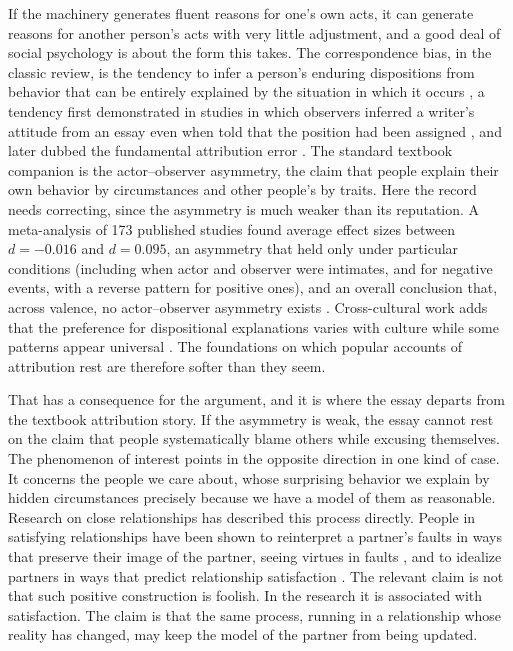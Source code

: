 \documentclass[11pt]{article}
\theoremstyle{definition}
\theoremstyle{remark}
\begin{document}
If the machinery generates fluent reasons for one's own acts, it can generate reasons for another person's acts with very little adjustment, and a good deal of social psychology is about the form this takes. The correspondence bias, in the classic review, is the tendency to infer a person's enduring dispositions from behavior that can be entirely explained by the situation in which it occurs \citep{gilbert1995}, a tendency first demonstrated in studies in which observers inferred a writer's attitude from an essay even when told that the position had been assigned \citep{jones1967}, and later dubbed the fundamental attribution error \citep{ross1977}. The standard textbook companion is the actor--observer asymmetry, the claim that people explain their own behavior by circumstances and other people's by traits. Here the record needs correcting, since the asymmetry is much weaker than its reputation. A meta-analysis of 173 published studies found average effect sizes between $d=-0.016$ and $d=0.095$, an asymmetry that held only under particular conditions (including when actor and observer were intimates, and for negative events, with a reverse pattern for positive ones), and an overall conclusion that, across valence, no actor--observer asymmetry exists \citep{malle2006}. Cross-cultural work adds that the preference for dispositional explanations varies with culture while some patterns appear universal \citep{choi1999}. The foundations on which popular accounts of attribution rest are therefore softer than they seem.

That has a consequence for the argument, and it is where the essay departs from the textbook attribution story. If the asymmetry is weak, the essay cannot rest on the claim that people systematically blame others while excusing themselves. The phenomenon of interest points in the opposite direction in one kind of case. It concerns the people we care about, whose surprising behavior we explain by hidden circumstances precisely because we have a model of them as reasonable. Research on close relationships has described this process directly. People in satisfying relationships have been shown to reinterpret a partner's faults in ways that preserve their image of the partner, seeing virtues in faults \citep{murray1993}, and to idealize partners in ways that predict relationship satisfaction \citep{murray1996}. The relevant claim is not that such positive construction is foolish. In the research it is associated with satisfaction. The claim is that the same process, running in a relationship whose reality has changed, may keep the model of the partner from being updated.
\end{document}
